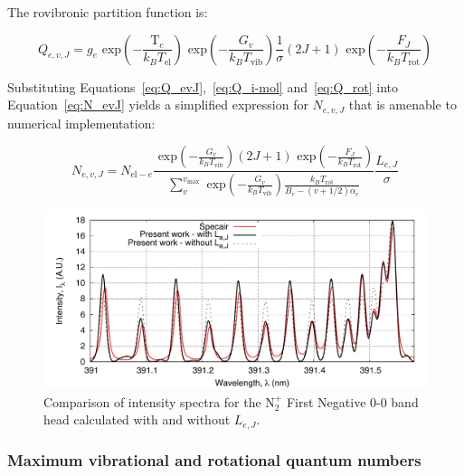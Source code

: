 \par

The rovibronic partition function is:

\begin{equation}
 Q_{e,v,J} = g_e \text{~exp} \left ( - \frac{\mathrm{T}_e}{k_B T_\text{el} } \right ) \text{~exp} \left ( - \frac{G_v}{k_B T_\text{vib} } \right ) \frac{1}{\sigma} \left( 2J + 1 \right ) \text{~exp} \left ( - \frac{F_{J}}{k_B T_\text{rot}} \right ) \label{eq:Q_evJ}
\end{equation}

\noindent Substituting Equations~\ref{eq:Q_evJ},~\ref{eq:Q_i-mol} and~\ref{eq:Q_rot} into Equation~\ref{eq:N_evJ} yields a simplified expression for $N_{e,v,J}$ that is amenable to numerical implementation:

\begin{equation}
  N_{e,v,J} = N_{\text{el}-e} \frac{ \text{~exp} \left ( - \frac{G_v}{k_B T_\text{vib} } \right ) \left( 2J + 1 \right ) \text{~exp} \left ( - \frac{F_{J}}{k_B T_\text{rot}} \right )}{ \displaystyle \sum_{v}^{v_\text{max}} \text{~exp} \left ( - \frac{G_{v}}{k_B T_\text{vib}} \right ) \frac{k_B T_\text{rot}}{B_{e} - (v + 1/2) \alpha_{e}}  } \frac{L_{e,J}}{\sigma} \label{eq:N_lvJ_expanded}
\end{equation}

\begin{figure}[htb]
 \includegraphics[width=\linewidth]{spectral-modelling/figures/N2_plus-FirstNeg-intensity_spectra_V_specair.pdf}
 \caption{Comparison of intensity spectra for the N$_2^+$ First Negative 0-0 band head calculated with and without $L_{e,J}$.}
 \label{fig:N2_plus_Vs_specair}
\end{figure}


\subsubsection{Maximum vibrational and rotational quantum numbers}

